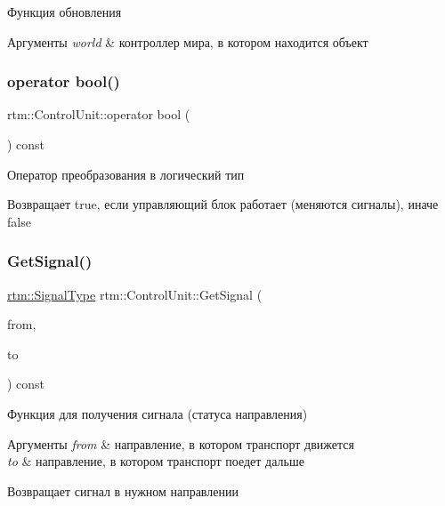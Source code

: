 Функция обновления 
\begin{DoxyParams}{Аргументы}
{\em world} & контроллер мира, в котором находится объект \\
\hline
\end{DoxyParams}
\mbox{\label{classrtm_1_1_control_unit_ab48f3a045d62fa1f251af2ece4b52d44}} 
\subsubsection{\texorpdfstring{operator bool()}{operator bool()}}
{\footnotesize\ttfamily rtm\+::\+Control\+Unit\+::operator bool (\begin{DoxyParamCaption}{ }\end{DoxyParamCaption}) const}

Оператор преобразования в логический тип \begin{DoxyReturn}{Возвращает}
true, если управляющий блок работает (меняются сигналы), иначе false 
\end{DoxyReturn}
\mbox{\label{classrtm_1_1_control_unit_afa3dcc399f2f5b7d0c1451aa65977da6}} 
\subsubsection{\texorpdfstring{Get\+Signal()}{GetSignal()}}
{\footnotesize\ttfamily \hyperlink{namespacertm_aadb7300c15d57429546fb0b7f8ee0ee6}{rtm\+::\+Signal\+Type} rtm\+::\+Control\+Unit\+::\+Get\+Signal (\begin{DoxyParamCaption}\item[{\hyperlink{namespacertm_a57b216f3aeb45041f3461bab08bc3aeb}{Direction\+Type}}]{from,  }\item[{\hyperlink{namespacertm_a57b216f3aeb45041f3461bab08bc3aeb}{Direction\+Type}}]{to }\end{DoxyParamCaption}) const}

Функция для получения сигнала (статуса направления) 
\begin{DoxyParams}{Аргументы}
{\em from} & направление, в котором транспорт движется \\
\hline
{\em to} & направление, в котором транспорт поедет дальше \\
\hline
\end{DoxyParams}
\begin{DoxyReturn}{Возвращает}
сигнал в нужном направлении 
\end{DoxyReturn}
\mbox{\label{classrtm_1_1_control_unit_af126b136af6883970ded2a592c90d2b1}} 
